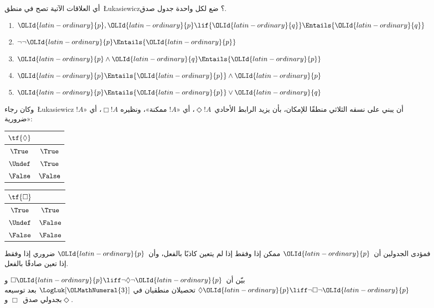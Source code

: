 \documentclass[../../../include/open-logic-section]{subfiles}
\begin{document}
\begin{prob}
  أي العلاقات الآتية تصح في منطق~\L ukasiewicz؟ ضع لكل واحدة جدول صدق.
  \begin{enumerate}
    \item ${\OLId{latin-ordinary}{p}}, {\OLId{latin-ordinary}{p}} \lif {\OLId{latin-ordinary}{q}} \Entails {\OLId{latin-ordinary}{q}}$
    \item $\lnot\lnot {\OLId{latin-ordinary}{p}} \Entails {\OLId{latin-ordinary}{p}}$
    \item ${\OLId{latin-ordinary}{p}} \land {\OLId{latin-ordinary}{q}} \Entails {\OLId{latin-ordinary}{p}}$
    \item ${\OLId{latin-ordinary}{p}} \Entails {\OLId{latin-ordinary}{p}} \land {\OLId{latin-ordinary}{p}}$
    \item ${\OLId{latin-ordinary}{p}} \Entails {\OLId{latin-ordinary}{p}} \lor {\OLId{latin-ordinary}{q}}$
  \end{enumerate}
\end{prob}

وكان رجاء~\L ukasiewicz أن يبني على نسقه الثلاثي منطقًا للإمكان،
بأن يزيد الرابط الأحادي~$\Diamond !A$، أي «$!A$ ممكنة»، ونظيره
$\Box !A$، أي «$!A$ ضرورية»:
\begin{center}
  \begin{tabular}{c|c}
    $\tf{\Diamond}$ & \\
    \hline
    $\True$ & $\True$ \\
    $\Undef$ & $\True$ \\
    $\False$ & $\False$
  \end{tabular}
  \quad
  \begin{tabular}{c|c}
    $\tf{\Box}$ & \\
    \hline
    $\True$ & $\True$ \\
    $\Undef$ & $\False$ \\
    $\False$ & $\False$
  \end{tabular}
\end{center}
فمؤدى الجدولين أن~${\OLId{latin-ordinary}{p}}$ ممكن إذا وفقط إذا لم يتعين كاذبًا بالفعل،
وأن~${\OLId{latin-ordinary}{p}}$ ضروري إذا وفقط إذا تعين صادقًا بالفعل.

\begin{prob}
  بيّن أن~$\Box {\OLId{latin-ordinary}{p}} \liff \lnot\Diamond \lnot {\OLId{latin-ordinary}{p}}$ و
  $\Diamond {\OLId{latin-ordinary}{p}} \liff \lnot \Box \lnot {\OLId{latin-ordinary}{p}}$ تحصيلان منطقيان في
  $\LogLuk[{\OLMathNumeral{3}}]$ بعد توسيعه بجدولي صدق~$\Box$ و$\Diamond$.
\end{prob}
\end{document}
